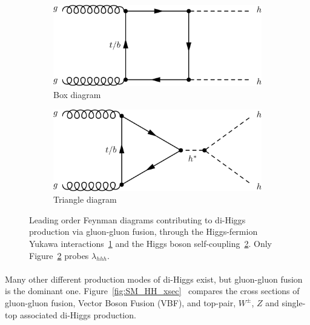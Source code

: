\begin{figure}[h!]
\centering
\captionsetup{justification=centering}
    \begin{subfigure}[b]{0.4\textwidth}
        \includegraphics[width=\textwidth]{figures/theory/SM_HH_box}
        \caption{Box diagram}
        \label{fig:SM_HH_box}
    \end{subfigure}
    \quad
    \begin{subfigure}[b]{0.4\textwidth}
        \includegraphics[width=\textwidth]{figures/theory/SM_HH_tri}
        \caption{Triangle diagram}
        \label{fig:SM_HH_tri}
    \end{subfigure}
\caption{Leading order Feynman diagrams contributing to di-Higgs production via gluon-gluon fusion, through the Higgs-fermion Yukawa interactions~\ref{fig:SM_HH_box} and the Higgs boson self-coupling~\ref{fig:SM_HH_tri}. Only Figure~\ref{fig:SM_HH_tri} probes $\lambda_{hhh}$.}
\label{fig:SM_HH}
\end{figure}

\paragraph{}
Many other different production modes of di-Higgs exist, but gluon-gluon fusion is the dominant one. Figure~\ref{fig:SM_HH_xsec}~\cite{Frederix:2014hta} compares the cross sections of gluon-gluon fusion, Vector Boson Fusion (VBF), and top-pair, $W^{\pm}$, $Z$ and single-top associated di-Higgs production.

